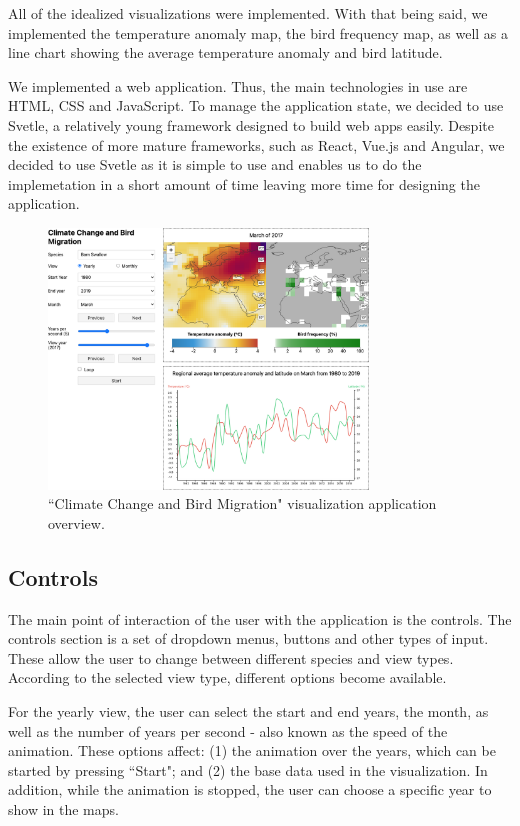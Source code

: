 \documentclass[journal]{vgtc}                %
\begin{document}
All of the idealized visualizations were implemented. With that being said, we implemented the temperature anomaly map, the bird frequency map, as well as a line chart showing the average temperature anomaly and bird latitude.

We implemented a web application. Thus, the main technologies in use are HTML, CSS and JavaScript. To manage the application state, we decided to use Svetle\cite{svetle}, a relatively young framework designed to build web apps easily. Despite the existence of more mature frameworks, such as React, Vue.js and Angular, we decided to use Svetle as it is simple to use and enables us to do the implemetation in a short amount of time leaving more time for designing the application.

\begin{figure}[h]
  \centering
  \includegraphics[width=85mm]{app-example.png}
  \caption{``Climate Change and Bird Migration" visualization application overview.}
  \label{fig:app-example}
\end{figure}

\subsection{Controls}

The main point of interaction of the user with the application is the controls. The controls section is a set of dropdown menus, buttons and other types of input. These allow the user to change between different species and view types. According to the selected view type, different options become available.

For the yearly view, the user can select the start and end years, the month, as well as the number of years per second - also known as the speed of the animation. These options affect: (1) the animation over the years, which can be started by pressing ``Start"; and (2) the base data used in the visualization. In addition, while the animation is stopped, the user can choose a specific year to show in the maps.
\end{document}

